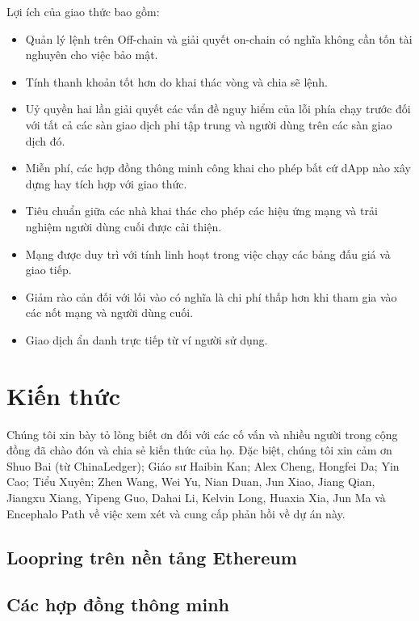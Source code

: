 \documentclass[12pt,a4paper]{article}
\begin{document}
\begin{multicols}{2}
Lợi ích của giao thức bao gồm:

\begin{itemize}
	\item Quản lý lệnh trên Off-chain  và giải quyết on-chain  có nghĩa không cần tốn tài nghuyên cho việc bảo mật.
	\item Tính thanh khoản tốt hơn do khai thác vòng và chia sẽ lệnh.
	\item Uỷ quyền hai lần giải quyết các vấn đề nguy hiểm của lỗi phía chạy trước đối với tất cả các sàn giao dịch phi tập trung và người dùng trên các sàn giao dịch đó.
	\item Miễn phí, các hợp đồng thông minh công khai cho phép bất cứ dApp nào xây dựng hay tích hợp với giao thức.
	\item Tiêu chuẩn giữa các nhà khai thác cho phép các hiệu ứng mạng và trải nghiệm người dùng cuối được cải thiện.
	\item Mạng được duy trì với tính linh hoạt trong việc chạy các bảng đấu giá và giao tiếp.
	\item Giảm rào cản đối với lối vào có nghĩa là chi phí thấp hơn khi tham gia vào các nốt mạng và người dùng cuối.
	\item Giao dịch ẩn danh trực tiếp từ ví người sử dụng.
\end{itemize}
\section{Kiến thức}
Chúng tôi xin bày tỏ lòng biết ơn đối với các cố vấn và nhiều người trong cộng đồng đã chào đón và chia sẻ kiến thức của họ. Đặc biệt, chúng tôi xin cảm ơn Shuo Bai (từ ChinaLedger); Giáo sư Haibin Kan; Alex Cheng, Hongfei Da; Yin Cao; Tiểu Xuyên; Zhen Wang, Wei Yu, Nian Duan, Jun Xiao, Jiang Qian, Jiangxu Xiang, Yipeng Guo, Dahai Li, Kelvin Long, Huaxia Xia, Jun Ma và Encephalo Path về việc xem xét và cung cấp phản hồi về dự án này.

\newpage 


\nocite{*}
\begin{appendices}
\section{Loopring trên nền tảng Ethereum}
\subsection{Các hợp đồng thông minh}



\end{appendices}
\end{multicols}
\end{document}
